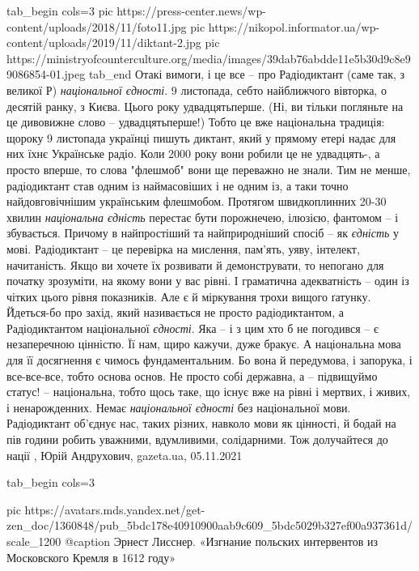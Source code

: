 \ifcmt
  tab_begin cols=3
     pic https://press-center.news/wp-content/uploads/2018/11/foto11.jpg
     pic https://nikopol.informator.ua/wp-content/uploads/2019/11/diktant-2.jpg
		 pic https://ministryofcounterculture.org/media/images/39dab76abdde11e5b30d9c8e99086854-01.jpeg
  tab_end
\fi
Отакі вимоги, і це все – про Радіодиктант (саме так, з великої Р) \emph{національної
єдності}. 9 листопада, себто найближчого вівторка, о десятій ранку, з Києва.
Цього року удвадцятьперше. (Ні, ви тільки погляньте на це дивовижне слово –
удвадцятьперше!) Тобто це вже національна традиція: щороку 9 листопада українці
пишуть диктант, який у прямому етері надає для них їхнє Українське радіо. Коли
2000 року вони робили це не удвадцять-, а просто вперше, то слова "флешмоб"
вони ще переважно не знали. Тим не менше, радіодиктант став одним із
наймасовіших і не одним із, а таки точно найдовговічнішим українським
флешмобом. Протягом швидкоплинних 20-30 хвилин \emph{національна єдність}
перестає бути порожнечею, ілюзією, фантомом – і збувається. Причому в
найпростіший та найприродніший спосіб – як \emph{єдність} у мові.  Радіодиктант
– це перевірка на мислення, пам'ять, уяву, інтелект, начитаність.  Якщо ви
хочете їх розвивати й демонструвати, то непогано для початку зрозуміти, на
якому вони у вас рівні. І граматична адекватність – один із чітких цього рівня
показників.  Але є й міркування трохи вищого ґатунку. Йдеться-бо про захід,
який називається не просто радіодиктантом, а Радіодиктантом національної
\emph{єдності}. Яка – і з цим хто б не погодився – є незаперечною цінністю. Її
нам, щиро кажучи, дуже бракує.  А національна мова для її досягнення є чимось
фундаментальним. Бо вона й передумова, і запорука, і все-все-все, тобто основа
основ. Не просто собі державна, а – підвищуймо статус! – національна, тобто
щось таке, що існує вже на рівні і мертвих, і живих, і ненарожденних. Немає
\emph{національної єдності} без національної мови. Радіодиктант об'єднує нас,
таких різних, навколо мови як цінності, й бодай на пів години робить уважними,
вдумливими, солідарними.  Тож долучайтеся до нації
, 
Юрій Андрухович, gazeta.ua, 05.11.2021

\ifcmt
  tab_begin cols=3

     pic https://avatars.mds.yandex.net/get-zen_doc/1360848/pub_5bdc178e40910900aab9c609_5bdc5029b327ef00a937361d/scale_1200
		 @caption Эрнест Лисснер. «Изгнание польских интервентов из Московского Кремля в 1612 году»

